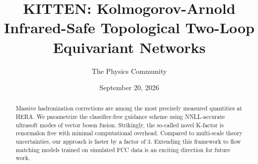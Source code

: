 \documentclass[11pt]{article}
\title{KITTEN: Kolmogorov-Arnold Infrared-Safe Topological Two-Loop Equivariant Networks}
\author{The Physics Community}
\date{September 20, 2026}
\numberwithin{equation}{section}
\theoremstyle{definition}
\theoremstyle{remark}
\begin{document}
\maketitle
\begin{abstract}
Massive hadronization corrections are among the most precisely measured
quantities at HERA. We parametrize the classifier-free guidance scheme
using NNLL-accurate ultrasoft modes of vector boson fusion. Strikingly,
the so-called novel K-factor is renormalon free with minimal
computational overhead. Compared to multi-scale theory uncertainties,
our approach is faster by a factor of 3. Extending this framework to
flow matching models trained on simulated FCC data is an exciting
direction for future work.
\end{abstract}
\tableofcontents





\nocite{*}


\end{document}
